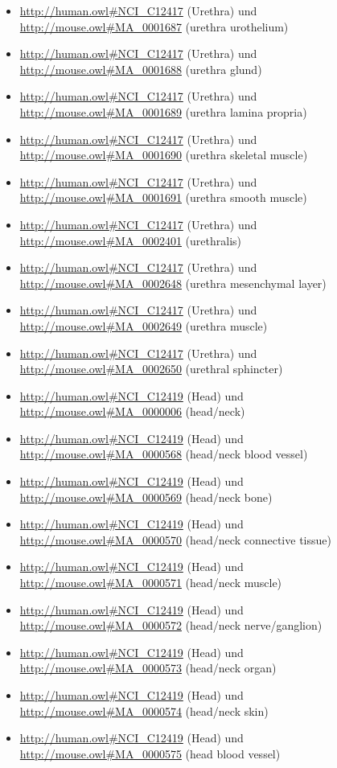 \begin{itemize}
	\item \url{http://human.owl#NCI_C12417} (Urethra) und \url{http://mouse.owl#MA_0001687} (urethra urothelium)
	\item \url{http://human.owl#NCI_C12417} (Urethra) und \url{http://mouse.owl#MA_0001688} (urethra glund)
	\item \url{http://human.owl#NCI_C12417} (Urethra) und \url{http://mouse.owl#MA_0001689} (urethra lamina propria)
	\item \url{http://human.owl#NCI_C12417} (Urethra) und \url{http://mouse.owl#MA_0001690} (urethra skeletal muscle)
	\item \url{http://human.owl#NCI_C12417} (Urethra) und \url{http://mouse.owl#MA_0001691} (urethra smooth muscle)
	\item \url{http://human.owl#NCI_C12417} (Urethra) und \url{http://mouse.owl#MA_0002401} (urethralis)
	\item \url{http://human.owl#NCI_C12417} (Urethra) und \url{http://mouse.owl#MA_0002648} (urethra mesenchymal layer)
	\item \url{http://human.owl#NCI_C12417} (Urethra) und \url{http://mouse.owl#MA_0002649} (urethra muscle)
	\item \url{http://human.owl#NCI_C12417} (Urethra) und \url{http://mouse.owl#MA_0002650} (urethral sphincter)
	\item \url{http://human.owl#NCI_C12419} (Head) und \url{http://mouse.owl#MA_0000006} (head/neck)
	\item \url{http://human.owl#NCI_C12419} (Head) und \url{http://mouse.owl#MA_0000568} (head/neck blood vessel)
	\item \url{http://human.owl#NCI_C12419} (Head) und \url{http://mouse.owl#MA_0000569} (head/neck bone)
	\item \url{http://human.owl#NCI_C12419} (Head) und \url{http://mouse.owl#MA_0000570} (head/neck connective tissue)
	\item \url{http://human.owl#NCI_C12419} (Head) und \url{http://mouse.owl#MA_0000571} (head/neck muscle)
	\item \url{http://human.owl#NCI_C12419} (Head) und \url{http://mouse.owl#MA_0000572} (head/neck nerve/ganglion)
	\item \url{http://human.owl#NCI_C12419} (Head) und \url{http://mouse.owl#MA_0000573} (head/neck organ)
	\item \url{http://human.owl#NCI_C12419} (Head) und \url{http://mouse.owl#MA_0000574} (head/neck skin)
	\item \url{http://human.owl#NCI_C12419} (Head) und \url{http://mouse.owl#MA_0000575} (head blood vessel)

\end{itemize}
